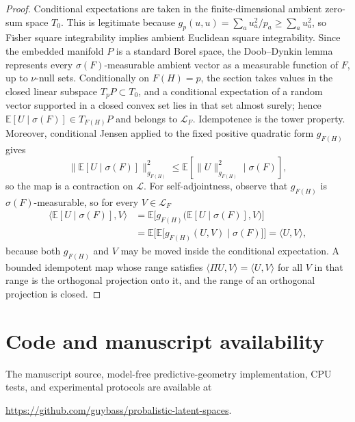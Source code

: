 \documentclass[11pt]{article}
\theoremstyle{definition}
\theoremstyle{remark}
\newcommand{\E}{\mathbb{E}}
\begin{document}
\begin{proof}
Conditional expectations are taken in the finite-dimensional ambient zero-sum
space $T_0$. This is legitimate because
$g_p(u,u)=\sum_a u_a^2/p_a\ge\sum_a u_a^2$, so Fisher square integrability
implies ambient Euclidean square integrability. Since the embedded manifold
$P$ is a standard Borel space, the Doob--Dynkin lemma represents every
$\sigma(F)$-measurable ambient vector as a measurable function of $F$, up to
$\nu$-null sets. Conditionally on $F(H)=p$, the section takes values in the closed
linear subspace $T_pP\subset T_0$, and a conditional expectation of a random
vector supported in a closed convex set lies in that set almost surely; hence
$\E[U\mid\sigma(F)]\in T_{F(H)}P$ and belongs to $\mathcal L_F$. Idempotence is
the tower property. Moreover, conditional Jensen applied to the fixed
positive quadratic form $g_{F(H)}$ gives
\begin{equation}
  \|\E[U\mid\sigma(F)]\|_{g_{F(H)}}^2
  \le \E[\|U\|_{g_{F(H)}}^2\mid\sigma(F)],
\end{equation}
so the map is a contraction on $\mathcal L$. For self-adjointness, observe that $g_{F(H)}$ is
$\sigma(F)$-measurable, so for every $V\in\mathcal L_F$
\begin{equation}
\begin{split}
    \langle\E[U\mid\sigma(F)],V\rangle
    &=\E\bigl[g_{F(H)}\bigl(\E[U\mid\sigma(F)],V\bigr)\bigr]\\
    &=\E\bigl[\E\bigl[g_{F(H)}(U,V)\mid\sigma(F)\bigr]\bigr]
     =\langle U,V\rangle,
\end{split}
\end{equation}
because both $g_{F(H)}$ and $V$ may be moved inside the conditional
expectation. A bounded idempotent map whose range satisfies
$\langle\Pi U,V\rangle=\langle U,V\rangle$ for all $V$ in that range is the
orthogonal projection onto it, and the range of an orthogonal projection is
closed.
\end{proof}

\section*{Code and manuscript availability}

The manuscript source, model-free predictive-geometry implementation, CPU tests, and experimental protocols are available at
\begin{center}
    \url{https://github.com/guybass/probalistic-latent-spaces}.
\end{center}



\end{document}
